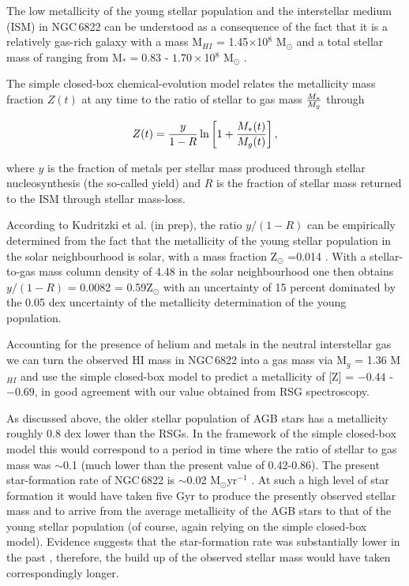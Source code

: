 The low metallicity of the young stellar population and the interstellar medium (ISM) in NGC\,6822 can be understood as a consequence of the fact that it is a relatively gas-rich galaxy with a mass
M$_{HI}$ = 1.45$\times$10$^{8}$ M$_{\odot}$
\citep{2004AJ....128...16K} and a total stellar mass of ranging from
M$_{*} =0.83$ - $1.70\times$10$^{8}$ M$_{\odot}$
\citep{2014ApJ...789..147W,2013ApJ...779..102K,2008MNRAS.390.1453W}.

The simple closed-box chemical-evolution model relates the metallicity mass fraction $Z(t)$ at any time to the ratio of stellar to gas mass $M_{*}\over M_{g}$ through

\begin{equation}\label{closed-box}
Z(t) = {y \over 1-R } \ln \left[ 1 + {M_{*}(t)\over M_{g}(t)}  \right],
\end{equation}

\noindent where $y$ is the fraction of metals per stellar mass produced through stellar nucleosynthesis
(the so-called yield) and $R$ is the fraction of stellar mass returned to the ISM through stellar mass-loss.

According to
Kudritzki et al. (in prep), the ratio $y/(1-R)$ can be empirically determined from the fact that the metallicity of the young stellar population in the solar neighbourhood is solar, with a mass fraction Z$_{\odot}$ =0.014
\citep{2012A&A...539A.143N}.
With a stellar-to-gas mass column density of 4.48 in the solar neighbourhood
\citep{2003ApJ...587..278W,2013ApJ...779..115B}
one then obtains $y/(1-R)$ = 0.0082 = 0.59Z$_{\odot}$ with an uncertainty of 15 percent dominated by the 0.05 dex uncertainty of the metallicity determination of the young population.

Accounting for the presence of helium and metals in the neutral interstellar gas we can turn the observed HI mass in NGC\,6822 into a gas mass via
M$_{g}$ = 1.36 M$_{HI}$ and use the simple closed-box model to predict a metallicity of
[Z] = $-0.44$ - $-0.69$,
in good agreement with our value obtained from RSG spectroscopy.

As discussed above, the older stellar population of AGB stars has a metallicity roughly 0.8 dex lower than the RSGs.
In the framework of the simple closed-box model this would correspond to a period in time where the ratio of stellar to gas mass was $\sim$0.1
(much lower than the present value of 0.42-0.86).
The present star-formation rate of NGC\,6822 is $\sim$0.02 M$_{\odot}$yr$^{-1}$
\citep{2010A&A...512A..68G,2011ApJ...730...88E}.
At such a high level of star formation it would have taken five Gyr to produce the presently observed stellar mass and to arrive from the average metallicity of the AGB stars to that of the young stellar population
(of course, again relying on the simple closed-box model).
Evidence suggests that the star-formation rate was substantially lower in the past
\citep{2014ApJ...789..147W,2011ApJ...730...88E},
therefore, the build up of the observed stellar mass would have taken correspondingly longer.


